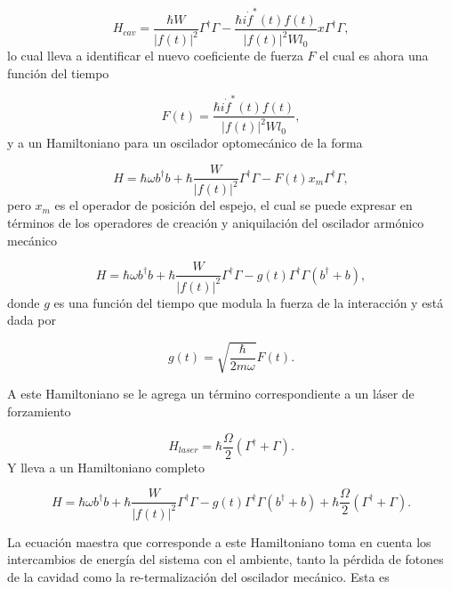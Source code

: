 \documentclass[10pt,a4paper]{report}
\begin{document}
\begin{equation}
H_{cav} = \frac{\hbar W}{|f(t)|^2}\Gamma^\dagger \Gamma - \frac{\hbar i\dot{f}^*(t)f(t) }{|f(t)|^2W l_0}x  \Gamma^ \dagger \Gamma,
\end{equation} lo cual lleva a identificar el nuevo coeficiente de fuerza $F$ el cual es ahora una función del tiempo

\begin{equation}
F(t) = \frac{\hbar i\dot{f}^*(t)f(t) }{|f(t)|^2W l_0},
\end{equation} y a un Hamiltoniano para un oscilador optomecánico de la forma

\begin{equation}
H = \hbar \omega b^\dagger b + \hbar\frac{ W}{|f(t)|^2}\Gamma^\dagger \Gamma -F(t)x_m\Gamma^\dagger \Gamma,
\end{equation} pero $x_m$ es el operador de posición del espejo, el cual se puede expresar en términos de los operadores de creación y aniquilación del oscilador armónico mecánico

\begin{equation}
H = \hbar \omega b^\dagger b + \hbar\frac{ W}{|f(t)|^2}\Gamma^\dagger \Gamma -g(t)\Gamma^\dagger \Gamma(b^\dagger + b),
\end{equation} donde $g$ es una función del tiempo que modula la fuerza de la interacción y está dada por

\begin{equation}
g(t) = \sqrt{\frac{\hbar}{2m\omega}}F(t).
\end{equation}

A este Hamiltoniano se le agrega un término correspondiente a un láser de forzamiento

\begin{equation}
H_{laser}= \hbar \frac{\Omega}{2}(\Gamma^\dagger + \Gamma).
\end{equation} Y lleva a un Hamiltoniano completo

\begin{equation}
H = \hbar \omega b^\dagger b + \hbar\frac{ W}{|f(t)|^2}\Gamma^\dagger \Gamma -g(t)\Gamma^\dagger \Gamma(b^\dagger + b) + \hbar \frac{\Omega}{2}(\Gamma^\dagger + \Gamma).
\end{equation}

 La ecuación maestra que corresponde a este Hamiltoniano toma en cuenta los intercambios de energía del sistema con el ambiente, tanto la pérdida de fotones de la cavidad como la re-termalización del oscilador mecánico. Esta es \cite{BarberisLC}
\end{document}
